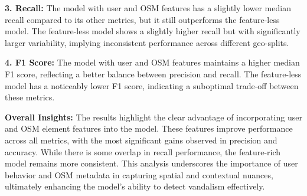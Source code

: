 \documentclass[
    13pt, %
    a4paper, %
    DIV14, %
    listof=totoc, %
    bibliography=totoc, %
    index=totoc, %
    headsepline
]{scrreprt}
\begin{document}
\textbf{3. Recall:} The model with user and OSM features has a slightly lower median recall compared to its other metrics, but it still outperforms the feature-less model. The feature-less model shows a slightly higher recall but with significantly larger variability, implying inconsistent performance across different geo-splits.

\textbf{4. F1 Score:} The model with user and OSM features maintains a higher median F1 score, reflecting a better balance between precision and recall. The feature-less model has a noticeably lower F1 score, indicating a suboptimal trade-off between these metrics.

\textbf{Overall Insights:}
The results highlight the clear advantage of incorporating user and OSM element features into the model. These features improve performance across all metrics, with the most significant gains observed in precision and accuracy. While there is some overlap in recall performance, the feature-rich model remains more consistent. This analysis underscores the importance of user behavior and OSM metadata in capturing spatial and contextual nuances, ultimately enhancing the model's ability to detect vandalism effectively.
\end{document}
